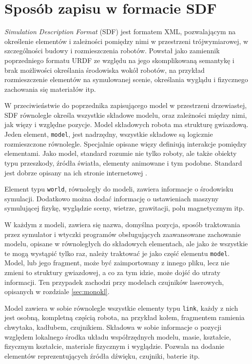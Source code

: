 \section{Sposób zapisu w formacie SDF}
\label{sec:sdf}
	\emph{Simulation Description Format} (SDF) jest formatem XML, pozwalającym na określenie elementów i zależności pomiędzy nimi w przestrzeni trójwymiarowej, 
	w szczególności budowy i rozmieszczenia robotów.
	Powstał jako zamiennik poprzedniego formatu URDF ze względu na jego skomplikowaną semantykę i brak możliwości określania środowiska wokół robotów, 
	na przykład rozmieszczenie elementów na symulowanej scenie, określania wyglądu i fizycznego zachowania się materiałów itp.

	W przeciwieństwie do poprzednika zapisującego model w przestrzeni drzewiastej, SDF równolegle określa wszystkie składowe modelu, 
	oraz zależności między nimi, jak więzy i względne pozycje.
	Model składowych robota ma strukturę gwiazdową. Jeden element, \texttt{model}, jest nadrzędny, wszystkie składowe są logicznie rozmieszczone równolegle.
	Specjalnie opisane więzy definiują interakcje pomiędzy elementami.
	Jako model, standard rozumie nie tylko roboty, ale także obiekty typu przeszkody, źródła światła, elementy animowane i tym podobne.
	Standard jest dobrze opisany na ich stronie internetowej \cite{sdf_website}.

	Element typu \texttt{world}, równoległy do modeli, zawiera informacje o środowisku symulacji.
	Dodatkowo można dodać informację o ustawieniach maszyny symulującej fizykę, wyglądzie sceny, wietrze, grawitacji, polu magnetycznym itp.

	W każdym z modeli, zawiera się nazwa, domyślna pozycja, sposób traktowania przez symulator i wtyczki programów obsługujących zaawansowane zachowanie modelu,
	opisane w równoległych do składowych elementach, ale jako że wszystkie te mogą wystąpić tylko raz, należy traktować je jako część elementu \texttt{model}.
	Model, lub jego fragment, może być zaimportowany z innego pliku, lecz nie zmieni to struktury gwiazdowej, a co za tym idzie, może dojść do utraty informacji.
	Ten przypadek zachodzi przy modelach czujników laserowych, opisanych w rozdziale \ref{sec:monokl}.

	Model zawiera w sobie równolegle wszystkie elementy typu \texttt{link}, każdy z nich jest osobną, kompletną częścią robota, na przykład kołem, 
	fragmentem ramienia chwytaka, kadłubem, czujnikiem.
	Składowa w sobie informacje o pozycji względem lokalnego środka układu współrzędnych modelu, masie, kształcie, fizycznym kształcie, materiale fizycznym i wyglądzie.
	Pozwala na dodanie elementów reprezentujących źródła dźwięku, czujniki, baterie itp.

